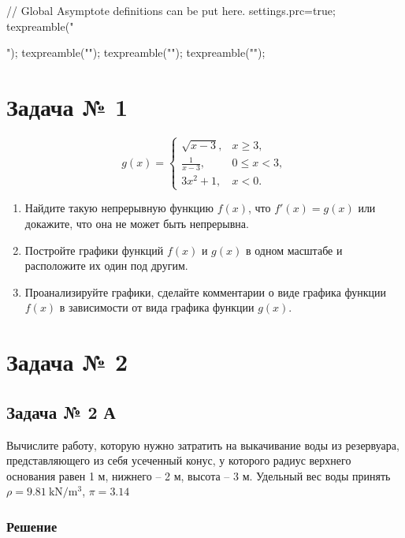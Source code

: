 \documentclass[a4paper,12pt]{article}
\begin{document}
\begin{asydef}
// Global Asymptote definitions can be put here.
settings.prc=true;
texpreamble("\usepackage{xltxtra,unicode-math}");
texpreamble("\setmainfont{Times New Roman}");
texpreamble("\setsansfont{Arial}\setmonofont{Courier New}");
texpreamble("");
\end{asydef}

\section{Задача № 1}

\[
  g(x) =
  \begin{cases}
    \sqrt{x - 3}, & x \ge 3, \\
    \frac{1}{x - 3}, & 0 \le x < 3, \\
    3 x^2 + 1, & x < 0.
  \end{cases}
\]

\begin{enumerate}
  \item
    Найдите такую непрерывную функцию \(f(x)\),
    что \(f'(x) = g(x)\) или докажите, что она не может быть непрерывна.
  \item
    Постройте графики функций \(f(x)\) и \(g(x)\) в одном масштабе
    и расположите их один под другим.
  \item
    Проанализируйте графики,
    сделайте комментарии о виде графика функции \(f(x)\)
    в зависимости от вида графика функции \(g(x)\).
\end{enumerate}

\section{Задача № 2}

\subsection{Задача № 2 А}

Вычислите работу, которую нужно затратить на выкачивание воды из резервуара,
представляющего из себя усеченный конус,
у которого радиус верхнего основания равен 1 м, нижнего – 2 м, высота – 3 м.
Удельный вес воды принять \(\rho = \SI{9.81}{\kN\per\cubic\metre}\),
\(\pi = \num{3.14}\)

\subsubsection{Решение}
\end{document}
